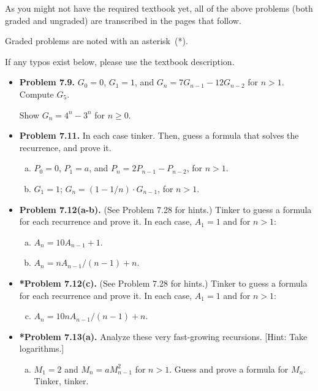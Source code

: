 \documentclass[11pt]{article}
\begin{document}
As you might not have the required textbook yet,
all of the above problems (both graded and ungraded)
are transcribed in the pages that follow.

Graded problems are noted with an asterisk~(*).

If any typos exist below, please use the textbook description.

\newpage
\begin{itemize}

\item \textbf{Problem 7.9.}
$G_0=0$, $G_1=1$, and $G_n=7G_{n-1}-12G_{n-2}$ for $n>1$.
Compute $G_5$.

Show $G_n=4^n-3^n$ for $n\ge 0$.

\vspace{0.1in}

\item \textbf{Problem 7.11.}
In each case tinker.
Then, guess a formula that solves the recurrence, and prove it.
\begin{enumerate}[(a)]
\item $P_0=0$, $P_1=a$, and $P_n=2P_{n-1}-P_{n-2}$, for $n>1$.
\item $G_1=1$; $G_n=(1-1/n)\cdot G_{n-1}$, for $n>1$.
\end{enumerate}

\vspace{0.1in}

\item \textbf{Problem 7.12(a-b).} (See Problem 7.28 for hints.)
Tinker to guess a formula for each recurrence and prove it.
In each case, $A_1=1$ and for $n>1$:
\begin{enumerate}[(a)]
\item $A_n=10A_{n-1}+1$.
\item $A_n=nA_{n-1}/(n-1)+n$.
\end{enumerate}

\vspace{0.1in}

\item \textbf{*Problem 7.12(c).} (See Problem 7.28 for hints.)
Tinker to guess a formula for each recurrence and prove it.
In each case, $A_1=1$ and for $n>1$:
\begin{enumerate}[(a)]
\setcounter{enumi}{2}
\item $A_n=10nA_{n-1}/(n-1)+n$.
\end{enumerate}

\vspace{0.1in}

\item \textbf{*Problem 7.13(a).}
Analyze these very fast-growing recursions.
[Hint: Take logarithms.]
\begin{enumerate}[(a)]
\item $M_1=2$ and $M_n=aM_{n-1}^2$ for $n>1$.
Guess and prove a formula for $M_n$.
Tinker, tinker.
\end{enumerate}


\end{itemize}
\end{document}
